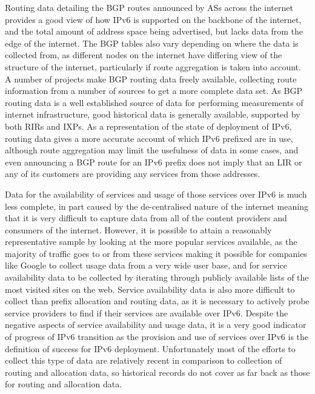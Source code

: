 Routing data detailing the BGP routes announced by ASs across the internet
provides a good view of how IPv6 is supported on the backbone of the internet,
and the total amount of address space being advertised, but lacks data from the
edge of the internet. The BGP tables also vary depending on where the data is
collected from, as different nodes on the internet have differing view of the
structure of the internet, particularly if route aggregation is taken into
account. A number of projects make BGP routing data freely available, collecting
route information from a number of sources to get a more complete data set. As
BGP routing data is a well established source of data for performing
measurements of internet infrastructure, good historical data is generally
available, supported by both RIRs and IXPs. As a representation of the state of
deployment of IPv6, routing data gives a more accurate account of which IPv6
prefixed are in use, although route aggregation may limit the usefulness of data
in some cases, and even announcing a BGP route for an IPv6 prefix does not
imply that an LIR or any of its customers are providing any services from those
addresses.

Data for the availability of services and usage of those services over IPv6 is
much less complete, in part caused by the de-centralised nature of the internet
meaning that it is very difficult to capture data from all of the content
providers and consumers of the internet. However, it is possible to attain a
reasonably representative sample by looking at the more popular services
available, as the majority of traffic goes to or from these services making it
possible for companies like Google to collect usage data from a very wide user
base, and for service availability data to be collected by iterating through
publicly available lists of the most visited sites on the web. Service
availability data is also more difficult to collect than prefix allocation and
routing data, as it is necessary to actively probe service providers to find if
their services are available over IPv6. Despite the negative aspects of service
availability and usage data, it is a very good indicator of progress of IPv6
transition as the provision and use of services over IPv6 is the definition of
success for IPv6 deployment. Unfortunately most of the efforts to collect this
type of data are relatively recent in comparison to collection of routing and
allocation data, so historical records do not cover as far back as those for
routing and allocation data.

